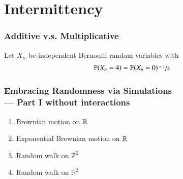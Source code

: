 \documentclass[9pt,xcolor=dvipsnames,table]{beamer}
\begin{document}
\section{Intermittency}
\begin{frame}[fragile,t] %
  \frametitle{\textcolor{cyan!50!black}{Additive} v.s. \textcolor{magenta!50!black}{Multiplicative}}

  \begin{center}
    Let $X_n$ be independent Bernoulli random variables with
    \begin{align*}
      \mathbb{P}(X_n=4)=\mathbb{P}(X_n=0)\sfrac{=1}{2}.
    \end{align*}
  \end{center}
  \bigskip \bigskip

  \begin{center}
   \end{center}
\end{frame}
\begin{frame}[fragile] %

  \frametitle{Embracing Randomness via Simulations \\ \bigskip --- Part I without interactions}

 \begin{enumerate}
   \item Brownian motion on $\mathbb{R}$             \bigskip
   \item Exponential Brownian motion on $\mathbb{R}$ \bigskip
   \item Random walk on $\mathbb{Z}^2$       \bigskip
   \item Random walk on $\mathbb{R}^2$       \bigskip
 \end{enumerate}
\end{frame}
\end{document}
